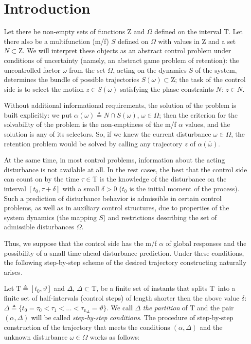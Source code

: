 \documentclass[sn-mathphys,Numbered,pdflatex]{sn-jnl}%
\theoremstyle{thmstyleone}%
\theoremstyle{thmstyletwo}%
\theoremstyle{thmstylethree}%
\newcommand{\mydef}{\mathrel{\triangleq}}%
\newcommand{\naOm}{\ensuremath{\Omega}}%
\newcommand{\naZ}{\ensuremath{\mathrm{Z}}}%
\newcommand{\naT}{\ensuremath{\mathrm{T}}}%
\begin{document}
\section*{Introduction}%

Let there be non-empty sets of functions $\naZ$ and $\naOm$ defined on the interval $\naT$.
Let there also be a multifunction (m/f) $S$ defined on $\naOm$ with values in $\naZ$ and a set $N\subset\naZ$.
We will interpret these objects as an abstract control problem under conditions of uncertainty (namely, an abstract game problem of retention):
the uncontrolled factor $\omega$ from the set $\naOm$, acting on the dynamics $S$ of the system, determines the bundle of possible trajectories $S(\omega)\subset\naZ$;
the task of the control side is to select the motion $z\in S(\omega)$ satisfying the phase constraints $N$: $z\in N$.

Without additional informational requirements, the solution of the problem is built explicitly:
we put $\alpha(\omega)\mydef N\cap S(\omega)$, $\omega\in\naOm$;
then the criterion for the solvability of the problem is the non-emptiness of the m/f $\alpha$ values, and the solution is any of its selectors.
So, if we knew the current disturbance $\bar\omega\in\naOm$, the retention problem would be solved by calling any trajectory $z$ of $\alpha(\bar\omega)$.

At the same time, in most control problems, information about the acting disturbance is not available at all.
In the rest cases, the best that the control side can count on by the time $\tau\in\naT$ is the knowledge of the disturbance on the interval $[t_0,\tau+\delta]$ with a small $\delta>0$ ($t_0$ is the initial moment of the process).
Such a prediction of disturbance behavior is admissible in certain control problems, as well as in auxiliary control structures, due to properties of the system dynamics (the mapping $S$) and restrictions describing the set of admissible disturbances $\naOm$.

Thus, we suppose that the control side has the m/f $\alpha$ of global responses and the possibility of a small time-ahead disturbance prediction.
Under these conditions, the following step-by-step scheme of the desired trajectory constructing naturally arises.

Let $\naT\mydef[t_0,\vartheta]$ and $\Delta$, $\Delta\subset\naT$, be a finite set of instants that splits \naT\ into a finite set of half-intervals (control steps) of length shorter then the above value $\delta$:
$\Delta\mydef\{t_0=\tau_0<\tau_1<\ldots<\tau_{n_\Delta}=\vartheta \}$.
We call $\Delta$ \emph{the partition} of $\naT$ and the pair $(\alpha,\Delta)$ will be called \emph{step-by-step conditions}.
The procedure of step-by-step construction of the trajectory that meets the conditions $(\alpha,\Delta)$ and the unknown disturbance $\bar\omega\in\naOm$ works as follows:
\end{document}
